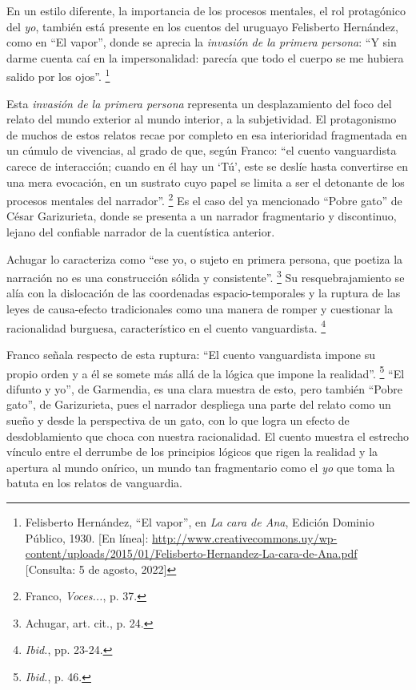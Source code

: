 \documentclass[14pt,twoside,final]{extbook} %
\let\oldfootnote\footnote
\renewcommand\footnote[1]{%
\oldfootnote{\hspace{1mm}#1}}
\begin{document}
En un estilo diferente, la importancia de los procesos mentales, el rol protagónico del \emph{yo}, también está presente en los cuentos del uruguayo Felisberto Hernández, como en ``El vapor'', donde se aprecia la \emph{invasión de la primera persona}: ``Y sin darme cuenta caí en la impersonalidad: parecía que todo el cuerpo se me hubiera salido por los ojos''.\footnote{Felisberto Hernández, ``El vapor'', en \emph{La cara de Ana}, Edición Dominio Público, 1930. [En línea]: \url{http://www.creativecommons.uy/wp-content/uploads/2015/01/Felisberto-Hernandez-La-cara-de-Ana.pdf} [Consulta: 5 de agosto, 2022]}

Esta \emph{invasión de la primera persona} representa un desplazamiento del foco del relato del mundo exterior al mundo interior, a la subjetividad. El protagonismo de muchos de estos relatos recae por completo en esa interioridad fragmentada en un cúmulo de vivencias, al grado de que, según Franco: ``el cuento vanguardista carece de interacción; cuando en él hay un `Tú', este se deslíe hasta convertirse en una mera evocación, en un sustrato cuyo papel se limita a ser el detonante de los procesos mentales del narrador''.\footnote{Franco, \emph{Voces...}, p. 37.} Es el caso del ya mencionado ``Pobre gato'' de César Garizurieta, donde se presenta a un narrador fragmentario y discontinuo, lejano del confiable narrador de la cuentística anterior.

Achugar lo caracteriza como ``ese yo, o sujeto en primera persona, que poetiza la narración no es una construcción sólida y consistente''.\footnote{Achugar, art. cit., p. 24.} Su resquebrajamiento se alía con la dislocación de las coordenadas espacio-temporales y la ruptura de las leyes de causa-efecto tradicionales como una manera de romper y cuestionar la racionalidad burguesa, característico en el cuento vanguardista.\footnote{\emph{Ibid.}, pp. 23-24.}

Franco señala respecto de esta ruptura: ``El cuento vanguardista impone su propio orden y a él se somete más allá de la lógica que impone la realidad''.\footnote{\emph{Ibid.}, p. 46.} ``El difunto y yo'', de Garmendia, es una clara muestra de esto, pero también ``Pobre gato'', de Garizurieta, pues el narrador despliega una parte del relato como un sueño y desde la perspectiva de un gato, con lo que logra un efecto de desdoblamiento que choca con nuestra racionalidad. El cuento muestra el estrecho vínculo entre el derrumbe de los principios lógicos que rigen la realidad y la apertura al mundo onírico, un mundo tan fragmentario como el \emph{yo} que toma la batuta en los relatos de vanguardia.
\end{document}
